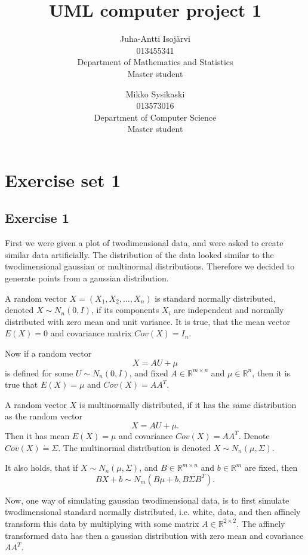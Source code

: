 \documentclass{article}
\begin{document}
\title{UML computer project 1}
\author{
Juha-Antti Isojärvi\\
013455341 \\
Department of Mathematics and Statistics\\
Master student
\and
Mikko Sysikaski\\
013573016\\
Department of Computer Science\\
Master student}
\date{}
\maketitle

\section{Exercise set 1}
\subsection{Exercise 1}
First we were given a plot of twodimensional data, and were asked to
create similar data artificially. The distribution of the data looked
similar to the twodimensional gaussian or multinormal
distributions. Therefore we decided to generate points from a
gaussian distribution. 

A random vector $X = (X_1, X_2, \dots, X_n)$ is standard normally
distributed, denoted $X \sim N_n(0,I)$, if its components $X_i$ are independent and normally
distributed with zero mean and unit variance. It is true, that the
mean vector $E(X) = 0$ and covariance matrix $Cov(X) = I_n$.

Now if a random vector 
\[
X = AU + \mu
\] 
is defined for some $U \sim N_n(0,I)$, and fixed $A \in \mathbb{R}^{m \times n}$
and $\mu \in \mathbb{R}^n$, then it is true that $E(X) = \mu$ and
$Cov(X) = AA^T$.

A random vector $X$ is multinormally
distributed, if it has the same
distribution as the random vector
\[
X = AU + \mu.
\]
Then it has mean $E(X) = \mu$ and covariance $Cov(X) = AA^T$. Denote
$Cov(X) \dot{=} \Sigma$. The multinormal distribution is denoted $X
\sim N_n(\mu,\Sigma)$.

It also holds, that if $X \sim N_n(\mu,\Sigma)$, and $B \in
\mathbb{R}^{m \times n}$ and $b \in \mathbb{R}^m$ are fixed, then 
\[
BX + b \sim N_m(B\mu + b, B \Sigma B^T).
\]

Now, one way of simulating gaussian twodimensional data, is to first
simulate twodimensional standard normally distributed, i.e. white, data, and then
affinely transform this data by multiplying with some matrix $A \in
\mathbb{R}^{2\times 2}$. The affinely transformed data has then a
gaussian distribution with zero mean and covariance $AA^T$.
\end{document}
